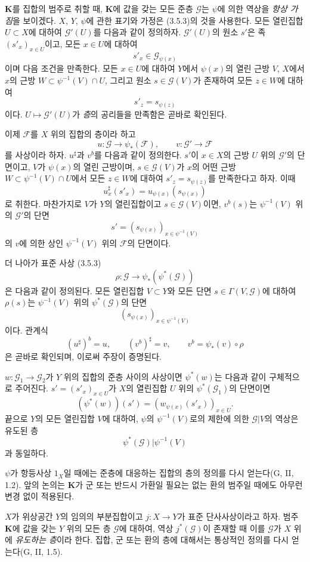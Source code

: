 \begin{env}[3.7.1]
\label{0.3.7.1-ko}
$\mathbf K$를 집합의 범주로 취할 때, $\mathbf K$에 값을 갖는 모든 준층 $\mathcal G$는 $\psi$에 의한 역상을 \emph{항상 가짐}을 보이겠다. $X$, $Y$, $\psi$에 관한 표기와 가정은 (3.5.3)의 것을 사용한다. 모든 열린집합 $U\subset X$에 대하여 $\mathcal G'(U)$를 다음과 같이 정의하자. $\mathcal G'(U)$의 원소 $s'$은 족 $(s'_x)_{x\in U}$이고, 모든 $x\in U$에 대하여
\[
  s'_x\in\mathcal G_{\psi(x)}
\]
이며 다음 조건을 만족한다. 모든 $x\in U$에 대하여 $Y$에서 $\psi(x)$의 열린 근방 $V$, $X$에서 $x$의 근방 $W\subset\psi^{-1}(V)\cap U$, 그리고 원소 $s\in\mathcal G(V)$가 존재하여 모든 $z\in W$에 대하여
\[
  s'_z=s_{\psi(z)}
\]
이다. $U\mapsto\mathcal G'(U)$가 \emph{층}의 공리들을 만족함은 곧바로 확인된다.

이제 $\mathcal F$를 $X$ 위의 집합의 층이라 하고
\[
  u:\mathcal G\longrightarrow\psi_*(\mathcal F),
  \qquad
  v:\mathcal G'\longrightarrow\mathcal F
\]
를 사상이라 하자. $u^\sharp$과 $v^b$를 다음과 같이 정의한다. $s'$이 $x\in X$의 근방 $U$ 위의 $\mathcal G'$의 단면이고, $V$가 $\psi(x)$의 열린 근방이며, $s\in\mathcal G(V)$가 $x$의 어떤 근방 $W\subset\psi^{-1}(V)\cap U$에서 모든 $z\in W$에 대하여 $s'_z=s_{\psi(z)}$를 만족한다고 하자. 이때
\[
  u_x^\sharp(s'_x)=u_{\psi(x)}(s_{\psi(x)})
\]
로 취한다. 마찬가지로 $V$가 $Y$의 열린집합이고 $s\in\mathcal G(V)$이면, $v^b(s)$는 $\psi^{-1}(V)$ 위의 $\mathcal G'$의 단면
\[
  s'=(s_{\psi(x)})_{x\in\psi^{-1}(V)}
\]
의 $v$에 의한 상인 $\psi^{-1}(V)$ 위의 $\mathcal F$의 단면이다.

더 나아가 표준 사상 (3.5.3)
\[
  \rho:\mathcal G\longrightarrow\psi_*(\psi^*(\mathcal G))
\]
은 다음과 같이 정의된다. 모든 열린집합 $V\subset Y$와 모든 단면 $s\in\Gamma(V,\mathcal G)$에 대하여 $\rho(s)$는 $\psi^{-1}(V)$ 위의 $\psi^*(\mathcal G)$의 단면
\[
  (s_{\psi(x)})_{x\in\psi^{-1}(V)}
\]
이다. 관계식
\[
  (u^\sharp)^b=u,\qquad
  (v^b)^\sharp=v,\qquad
  v^b=\psi_*(v)\circ\rho
\]
은 곧바로 확인되며, 이로써 주장이 증명된다.

$w:\mathcal G_1\to\mathcal G_2$가 $Y$ 위의 집합의 준층 사이의 사상이면 $\psi^*(w)$는 다음과 같이 구체적으로 주어진다. $s'=(s'_x)_{x\in U}$가 $X$의 열린집합 $U$ 위의 $\psi^*(\mathcal G_1)$의 단면이면
\[
  (\psi^*(w))(s')
  =(w_{\psi(x)}(s'_x))_{x\in U}.
\]
끝으로 $Y$의 모든 열린집합 $V$에 대하여, $\psi$의 $\psi^{-1}(V)$로의 제한에 의한 $\mathcal G|V$의 역상은 유도된 층
\[
  \psi^*(\mathcal G)|\psi^{-1}(V)
\]
과 동일하다.

$\psi$가 항등사상 $1_X$일 때에는 준층에 대응하는 집합의 층의 정의를 다시 얻는다(G, II, 1.2). 앞의 논의는 $\mathbf K$가 군 또는 반드시 가환일 필요는 없는 환의 범주일 때에도 아무런 변경 없이 적용된다.

$X$가 위상공간 $Y$의 임의의 부분집합이고 $j:X\to Y$가 표준 단사사상이라고 하자. 범주 $\mathbf K$에 값을 갖는 $Y$ 위의 모든 층 $\mathcal G$에 대하여, 역상 $j^*(\mathcal G)$이 존재할 때 이를 $\mathcal G$가 $X$ 위에 \emph{유도하는 층}이라 한다. 집합, 군 또는 환의 층에 대해서는 통상적인 정의를 다시 얻는다(G, II, 1.5).
\end{env}


